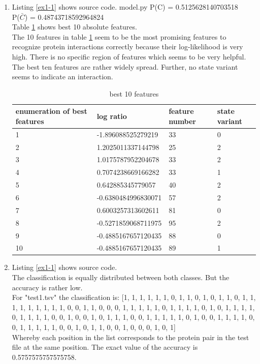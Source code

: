 \documentclass[10pt,a4paper]{article}
\begin{document}
\begin{enumerate}
\item Listing \ref{ex1-1} shows source code.
 {model.py}
P(C) = 0.5125628140703518\\
P($\bar{C}$) = 0.48743718592964824\\
Table \ref{tab1} shows best 10 absolute features.\\
The 10 features in table \ref{tab1} seem to be the most promising features to recognize protein interactions correctly because their log-likelihood is very high. There is no specific region of features which seems to be very helpful. The best ten features are rather widely spread. Further, no state variant seems to indicate an interaction.
\begin{table}[!h]
\label{tab1}
\begin{tabular}{llll}
enumeration of best features & log ratio & feature number & state variant\\
\hline
1 & -1.896088525279219 & 33 & 0\\
2 & 1.2025011337144798 & 25 & 2\\
3 & 1.0175787952204678 & 33 & 2\\
4 & 0.7074238669166282 & 33 & 1\\
5 & 0.642885345779057 & 40 & 2\\
6 & -0.6380484996830071 & 57 & 2\\
7 & 0.6003257313602611 & 81 & 0\\
8 & -0.5271859068711975 & 95 & 2\\
9 & -0.4885167657120435 & 88 & 0\\
10 & -0.4885167657120435 & 89 & 1\\
\end{tabular}
\caption{best 10 features}
\end{table}

\item Listing \ref{ex1-1} shows source code.\\
The classification is equally distributed between both classes. But the accuracy is rather low.\\
For "test1.tsv" the classification is: [1, 1, 1, 1, 1, 1, 0, 1, 1, 0, 1, 0, 1, 1, 0, 1, 1, 1, 1, 1, 1, 1, 1, 1, 0, 0, 1, 1, 0, 0, 0, 1, 1, 1, 1, 1, 0, 1, 1, 1, 1, 0, 1, 0, 1, 1, 1, 1, 0, 1, 1, 1, 1, 0, 0, 1, 0, 0, 1, 0, 1, 1, 1, 0, 0, 1, 1, 1, 1, 1, 0, 1, 0, 0, 1, 1, 1, 1, 0, 0, 1, 1, 1, 1, 1, 0, 0, 1, 0, 1, 1, 0, 0, 1, 0, 0, 0, 1, 0, 1]\\
Whereby each position in the list corresponds to the protein pair in the test file at the same position. The exact value of the accuracy is 0.5757575757575758.


\end{enumerate}
\end{document}
